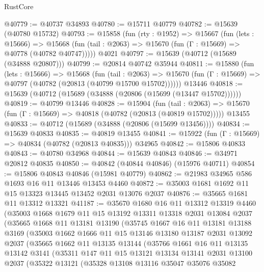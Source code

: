 \begin{lexlean}{RustCore}
\begin{coremodule}
@40779 := @40737 @34893
@40780 := @15711 @40779
@40782 := @15639 (@40780 @15732)
@40793 := @15858
    (fun (rty : @1952) =>
    @15667
      (fun (lets : @15666) =>
      @15668 (fun (tail : @2063) => @15670 (fun (Γ : @15669) => @40778 (@40782 @40747)))))
    @4021
@40797 := @15639 (@40712 (@15689 (@34888 @20807)))
@40799 := @20814 @40742 @35944
@40811 := @15880
    (fun (lets : @15666) =>
    @15668
      (fun (tail : @2063) =>
      @15670 (fun (Γ : @15669) => @40797 (@40782 (@20813 (@40799 @15700 @15702))))))
    @13446
@40818 := @15639 (@40712 (@15689 (@34888 (@20806 (@15699 (@13447 @15702))))))
@40819 := @40799 @13446
@40828 := @15904
    (fun (tail : @2063) => @15670 (fun (Γ : @15669) => @40818 (@40782 (@20813 (@40819 @15702)))))
    @13455
@40833 := @40712 (@15689 (@34888 (@20806 (@15699 @13456))))
@40834 := @15639 @40833
@40835 := @40819 @13455
@40841 := @15922 (fun (Γ : @15669) => @40834 (@40782 (@20813 @40835))) @34965
@40842 := @15806 @40833
@40843 := @40780 @34968
@40844 := @15639 @40843
@40846 := @34971 @20812 @40835
@40850 := @40842 (@40844 @40846) (@15976 @40711)
@40854 := @15806 @40843 @40846 (@15981 @40779)
@40862 := @21983 @34965 @586 @1693 @16 @11 @13446 @13453 @4460
@40872 := @35003 @1681 @1692 @11 @15 @13323 @13445 @13452 @2031 @13076 @2037
@40876 := @35665 @1681 @11 @13312 @13321
@41187 := @35670
    @1680
    @16
    @11
    @13312
    @13319
    @4460
    (@35003
      @1668
      @1679
      @11
      @15
      @13192
      @13311
      @13318
      @2031
      @13084
      @2037
      (@35665
        @1668
        @11
        @13181
        @13190
        (@35745
          @1667
          @16
          @11
          @13181
          @13188
          @3169
          (@35003
            @1662
            @1666
            @11
            @15
            @13146
            @13180
            @13187
            @2031
            @13092
            @2037
            (@35665
              @1662
              @11
              @13135
              @13144
              (@35766
                @1661
                @16
                @11
                @13135
                @13142
                @3141
                (@35311
                  @147
                  @11
                  @15
                  @13121
                  @13134
                  @13141
                  @2031
                  @13100
                  @2037
                  (@35322
                    @13121
                    (@35328
                      @13108
                      @13116
                      @35047
                      @35076
                      @35082

\end{coremodule}
\end{lexlean}
